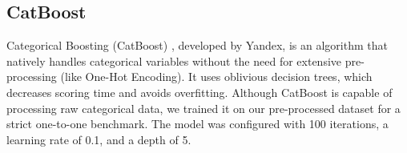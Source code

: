 \subsection{CatBoost}
Categorical Boosting (CatBoost) \cite{prokhorenkova2018catboost}, developed by Yandex, is an algorithm that natively handles categorical variables without the need for extensive pre-processing (like One-Hot Encoding). It uses oblivious decision trees, which decreases scoring time and avoids overfitting. Although CatBoost is capable of processing raw categorical data, we trained it on our pre-processed dataset for a strict one-to-one benchmark. The model was configured with 100 iterations, a learning rate of 0.1, and a depth of 5.